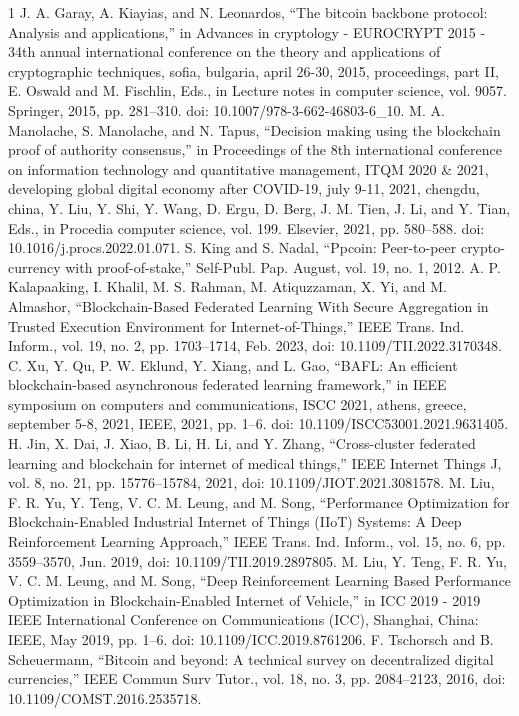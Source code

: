 \documentclass[lettersize,journal]{IEEEtran}
\begin{document}
\begin{thebibliography}{1}
\bibitem{}J. A. Garay, A. Kiayias, and N. Leonardos, “The bitcoin backbone protocol: Analysis and applications,” in Advances in cryptology - EUROCRYPT 2015 - 34th annual international conference on the theory and applications of cryptographic techniques, sofia, bulgaria, april 26-30, 2015, proceedings, part II, E. Oswald and M. Fischlin, Eds., in Lecture notes in computer science, vol. 9057. Springer, 2015, pp. 281–310. doi: 10.1007/978-3-662-46803-6\_10.
\bibitem{}M. A. Manolache, S. Manolache, and N. Tapus, “Decision making using the blockchain proof of authority consensus,” in Proceedings of the 8th international conference on information technology and quantitative management, ITQM 2020 \& 2021, developing global digital economy after COVID-19, july 9-11, 2021, chengdu, china, Y. Liu, Y. Shi, Y. Wang, D. Ergu, D. Berg, J. M. Tien, J. Li, and Y. Tian, Eds., in Procedia computer science, vol. 199. Elsevier, 2021, pp. 580–588. doi: 10.1016/j.procs.2022.01.071.
\bibitem{}S. King and S. Nadal, “Ppcoin: Peer-to-peer crypto-currency with proof-of-stake,” Self-Publ. Pap. August, vol. 19, no. 1, 2012.
\bibitem{}A. P. Kalapaaking, I. Khalil, M. S. Rahman, M. Atiquzzaman, X. Yi, and M. Almashor, “Blockchain-Based Federated Learning With Secure Aggregation in Trusted Execution Environment for Internet-of-Things,” IEEE Trans. Ind. Inform., vol. 19, no. 2, pp. 1703–1714, Feb. 2023, doi: 10.1109/TII.2022.3170348.
\bibitem{}C. Xu, Y. Qu, P. W. Eklund, Y. Xiang, and L. Gao, “BAFL: An efficient blockchain-based asynchronous federated learning framework,” in IEEE symposium on computers and communications, ISCC 2021, athens, greece, september 5-8, 2021, IEEE, 2021, pp. 1–6. doi: 10.1109/ISCC53001.2021.9631405.
\bibitem{}H. Jin, X. Dai, J. Xiao, B. Li, H. Li, and Y. Zhang, “Cross-cluster federated learning and blockchain for internet of medical things,” IEEE Internet Things J, vol. 8, no. 21, pp. 15776–15784, 2021, doi: 10.1109/JIOT.2021.3081578.
\bibitem{}M. Liu, F. R. Yu, Y. Teng, V. C. M. Leung, and M. Song, “Performance Optimization for Blockchain-Enabled Industrial Internet of Things (IIoT) Systems: A Deep Reinforcement Learning Approach,” IEEE Trans. Ind. Inform., vol. 15, no. 6, pp. 3559–3570, Jun. 2019, doi: 10.1109/TII.2019.2897805.
\bibitem{}M. Liu, Y. Teng, F. R. Yu, V. C. M. Leung, and M. Song, “Deep Reinforcement Learning Based Performance Optimization in Blockchain-Enabled Internet of Vehicle,” in ICC 2019 - 2019 IEEE International Conference on Communications (ICC), Shanghai, China: IEEE, May 2019, pp. 1–6. doi: 10.1109/ICC.2019.8761206.
\bibitem{}F. Tschorsch and B. Scheuermann, “Bitcoin and beyond: A technical survey on decentralized digital currencies,” IEEE Commun Surv Tutor., vol. 18, no. 3, pp. 2084–2123, 2016, doi: 10.1109/COMST.2016.2535718.

\end{thebibliography}
\end{document}
